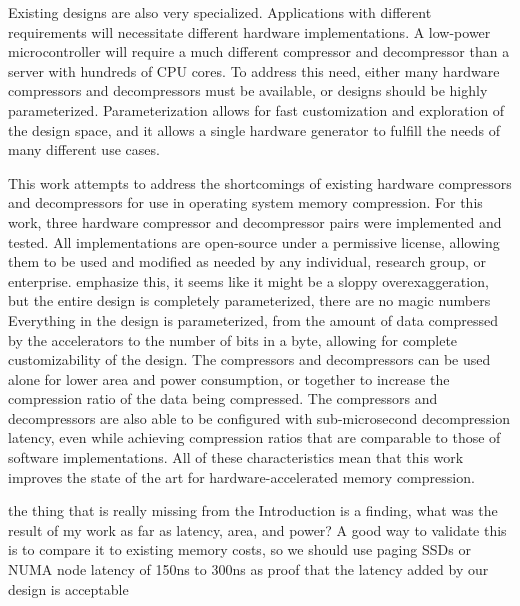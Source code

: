 \documentclass[doublespace,nopageskip]{VTthesis}
\begin{document}
Existing designs are also very specialized. Applications with different requirements will necessitate different hardware implementations. A low-power microcontroller will require a much different compressor and decompressor than a server with hundreds of CPU cores. To address this need, either many hardware compressors and decompressors must be available, or designs should be highly parameterized. Parameterization allows for fast customization and exploration of the design space, and it allows a single hardware generator to fulfill the needs of many different use cases.

This work attempts to address the shortcomings of existing hardware compressors and decompressors for use in operating system memory compression. For this work, three hardware compressor and decompressor pairs were implemented and tested. All implementations are open-source under a permissive license, allowing them to be used and modified as needed by any individual, research group, or enterprise. {\color{red} emphasize this, it seems like it might be a sloppy overexaggeration, but the entire design is completely parameterized, there are no magic numbers} Everything in the design is parameterized, from the amount of data compressed by the accelerators to the number of bits in a byte, allowing for complete customizability of the design. The compressors and decompressors can be used alone for lower area and power consumption, or together to increase the compression ratio of the data being compressed. The compressors and decompressors are also able to be configured with sub-microsecond decompression latency, even while achieving compression ratios that are comparable to those of software implementations. All of these characteristics mean that this work improves the state of the art for hardware-accelerated memory compression.

{\color{red} the thing that is really missing from the Introduction is a finding, what was the result of my work as far as latency, area, and power? A good way to validate this is to compare it to existing memory costs, so we should use paging SSDs or NUMA node latency of 150ns to 300ns as proof that the latency added by our design is acceptable}
	
\end{document}
